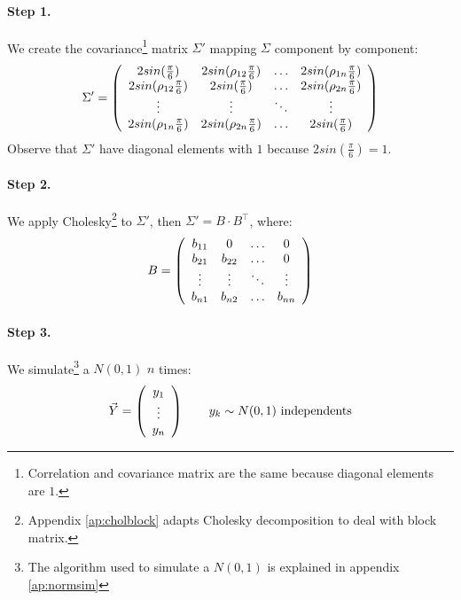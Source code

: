 \documentclass[a4paper,12pt,final]{article}
\begin{document}
\paragraph{Step 1.} We create the covariance\footnote{Correlation and covariance 
matrix are the same because diagonal elements are $1$.} matrix $\Sigma'$ mapping 
$\Sigma$ component by component:
\begin{displaymath}
\Sigma' = \left( 
\begin{array}{cccc}
2 sin(\frac{\pi}{6})           & 2 sin(\rho_{12} \frac{\pi}{6}) & \ldots & 2 sin(\rho_{1n} \frac{\pi}{6})\cr
2 sin(\rho_{12} \frac{\pi}{6}) & 2 sin(\frac{\pi}{6})           & \ldots & 2 sin(\rho_{2n} \frac{\pi}{6})\cr
\vdots                         & \vdots                         & \ddots  & \vdots   \cr
2 sin(\rho_{1n} \frac{\pi}{6}) & 2 sin(\rho_{2n} \frac{\pi}{6}) & \ldots & 2 sin(\frac{\pi}{6})
\end{array}
\right)
\end{displaymath}
Observe that $\Sigma'$ have diagonal elements with $1$ because $2 sin(\frac{\pi}{6}) = 1$.

\paragraph{Step 2.} We apply Cholesky\footnote{Appendix \ref{ap:cholblock} adapts Cholesky 
decomposition to deal with block matrix.} to $\Sigma'$, then $\Sigma' = B \cdot B^{\top}$, 
where:
\begin{displaymath}
B = 
\left(
\begin{array}{cccc}
b_{11}   & 0        & \ldots & 0       \cr
b_{21}   & b_{22}   & \ldots & 0       \cr
\vdots  & \vdots  & \ddots & \vdots \cr
b_{n1}   & b_{n2}   & \ldots & b_{nn}
\end{array}
\right)
\end{displaymath}

\paragraph{Step 3.} We simulate\footnote{The algorithm used to simulate a $N(0,1)$
is explained in appendix \ref{ap:normsim}} a $N(0,1)$ $n$ times:
\begin{displaymath}
\vec{Y} =
\left(
\begin{array}{c}
y_1 \cr
\vdots \cr
y_n
\end{array}
\right) 
\qquad y_k \sim N(0,1) \textrm{ independents}
\end{displaymath}
\end{document}
